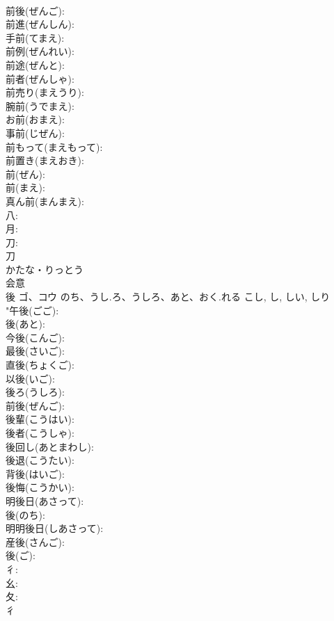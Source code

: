\documentclass[8pt]{extreport}
\begin{document}
\begin{CJK}{UTF8}{min}
\\	前後(ぜんご): 
\\	前進(ぜんしん): 
\\	手前(てまえ): 
\\	前例(ぜんれい): 
\\	前途(ぜんと): 
\\	前者(ぜんしゃ): 
\\	前売り(まえうり): 
\\	腕前(うでまえ): 
\\	お前(おまえ): 
\\	事前(じぜん): 
\\	前もって(まえもって): 
\\	前置き(まえおき): 
\\	前(ぜん): 
\\	前(まえ): 
\\	真ん前(まんまえ): 
\\	八: 
\\	月: 
\\	刀: 
\\	刀	
\\	かたな・りっとう	
\\	会意 
\\	後	ゴ、コウ	のち、うし.ろ、うしろ、あと、おく.れる	こし, し, しい, しり	
\\	"午後(ごご): 
\\	後(あと): 
\\	今後(こんご): 
\\	最後(さいご): 
\\	直後(ちょくご): 
\\	以後(いご): 
\\	後ろ(うしろ): 
\\	前後(ぜんご): 
\\	後輩(こうはい): 
\\	後者(こうしゃ): 
\\	後回し(あとまわし): 
\\	後退(こうたい): 
\\	背後(はいご): 
\\	後悔(こうかい): 
\\	明後日(あさって): 
\\	後(のち): 
\\	明明後日(しあさって): 
\\	産後(さんご): 
\\	後(ご): 
\\	彳: 
\\	幺: 
\\	夂: 
\\	彳	

\end{CJK}
\end{document}
